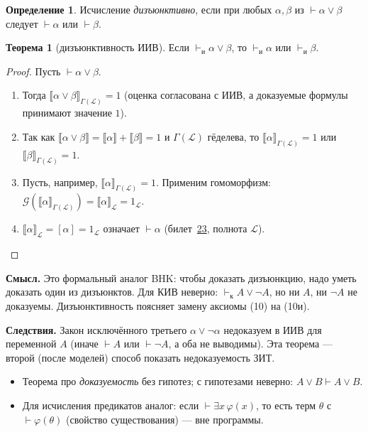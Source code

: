 \documentclass[11pt,a4paper]{article}
\newcommand{\vd}{\vdash}
\newcommand{\sem}[1]{\llbracket #1\rrbracket}
\theoremstyle{definition}
\newtheorem*{dfn}{Определение}
\newtheorem*{thm}{Теорема}
\begin{document}
\begin{dfn}
Исчисление \emph{дизъюнктивно}, если при любых $\alpha,\beta$ из $\vd\alpha\vee\beta$ следует $\vd\alpha$ или $\vd\beta$.
\end{dfn}
\begin{thm}[дизъюнктивность ИИВ]
Если $\vd_{\text{и}}\alpha\vee\beta$, то $\vd_{\text{и}}\alpha$ или $\vd_{\text{и}}\beta$.
\end{thm}
\begin{proof}
Пусть $\vd\alpha\vee\beta$.
\begin{enumerate}
\item Тогда $\sem{\alpha\vee\beta}_{\Gamma(\mathcal{L})}=1$ (оценка согласована с ИИВ, а доказуемые формулы принимают значение $1$).
\item Так как $\sem{\alpha\vee\beta}=\sem{\alpha}+\sem{\beta}=1$ и $\Gamma(\mathcal{L})$ гёделева, то $\sem{\alpha}_{\Gamma(\mathcal{L})}=1$ или $\sem{\beta}_{\Gamma(\mathcal{L})}=1$.
\item Пусть, например, $\sem{\alpha}_{\Gamma(\mathcal{L})}=1$. Применим гомоморфизм: $\mathcal{G}(\sem{\alpha}_{\Gamma(\mathcal{L})})=\sem{\alpha}_{\mathcal{L}}=1_{\mathcal{L}}$.
\item $\sem{\alpha}_{\mathcal{L}}=[\alpha]=1_{\mathcal{L}}$ означает $\vd\alpha$ (билет~\hyperref[T:23]{23}, полнота $\mathcal{L}$).\qedhere
\end{enumerate}
\end{proof}

\textbf{Смысл.} Это формальный аналог BHK: чтобы доказать дизъюнкцию, надо уметь доказать один из дизъюнктов. Для КИВ неверно: $\vd_{\text{к}}A\vee\neg A$, но ни $A$, ни $\neg A$ не доказуемы. Дизъюнктивность поясняет замену аксиомы (10) на (10и).

\textbf{Следствия.} Закон исключённого третьего $\alpha\vee\neg\alpha$ недоказуем в ИИВ для переменной $A$ (иначе $\vd A$ или $\vd\neg A$, а оба не выводимы). Эта теорема --- второй (после моделей) способ показать недоказуемость ЗИТ.

\begin{warn}
\begin{itemize}
\item Теорема про \emph{доказуемость} без гипотез; с гипотезами неверно: $A\vee B\vd A\vee B$.
\item Для исчисления предикатов аналог: если $\vd\exists x\,\varphi(x)$, то есть терм $\theta$ с $\vd\varphi(\theta)$ (свойство существования) --- вне программы.
\end{itemize}
\end{warn}

\bigskip
\begin{center}
\end{center}
\end{document}
